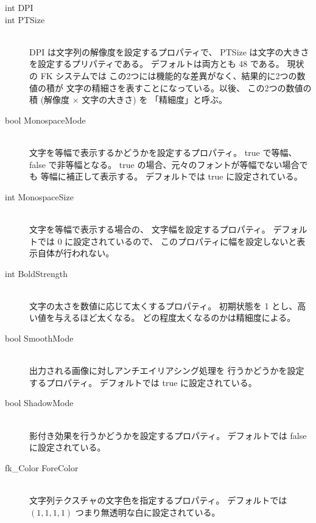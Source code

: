 \begin{description}
\item[int DPI]
\item[int PTSize] ~ \\
	DPI は文字列の解像度を設定するプロパティで、
	PTSize は文字の大きさを設定するプリパティである。
	デフォルトは両方とも 48 である。
	現状の FK システムでは
	この2つには機能的な差異がなく、結果的に2つの数値の積が
	文字の精細さを表すことになっている。以後、
	この2つの数値の積 (解像度 \(\times\) 文字の大きさ) を
	「精細度」と呼ぶ。\\

\item[bool MonospaceMode] ~ \\
	文字を等幅で表示するかどうかを設定するプロパティ。
	true で等幅、false で非等幅となる。
	true の場合、元々のフォントが等幅でない場合でも
	等幅に補正して表示する。
	デフォルトでは true に設定されている。\\

\item[int MonospaceSize] ~ \\
	文字を等幅で表示する場合の、
	文字幅を設定するプロパティ。
	デフォルトでは 0 に設定されているので、
	このプロパティに幅を設定しないと表示自体が行われない。\\

\item[int BoldStrength] ~ \\
	文字の太さを数値に応じて太くするプロパティ。
	初期状態を 1 とし、高い値を与えるほど太くなる。
	どの程度太くなるのかは精細度による。\\

\item[bool SmoothMode] ~ \\
	出力される画像に対しアンチエイリアシング処理を
	行うかどうかを設定するプロパティ。
	デフォルトでは true に設定されている。\\

\item[bool ShadowMode] ~ \\
	影付き効果を行うかどうかを設定するプロパティ。
	デフォルトでは false に設定されている。\\

\item[fk\_Color ForeColor] ~ \\
	文字列テクスチャの文字色を指定するプロパティ。
	デフォルトでは \((1, 1, 1, 1)\) つまり無透明な白に設定されている。\\


\end{description}
